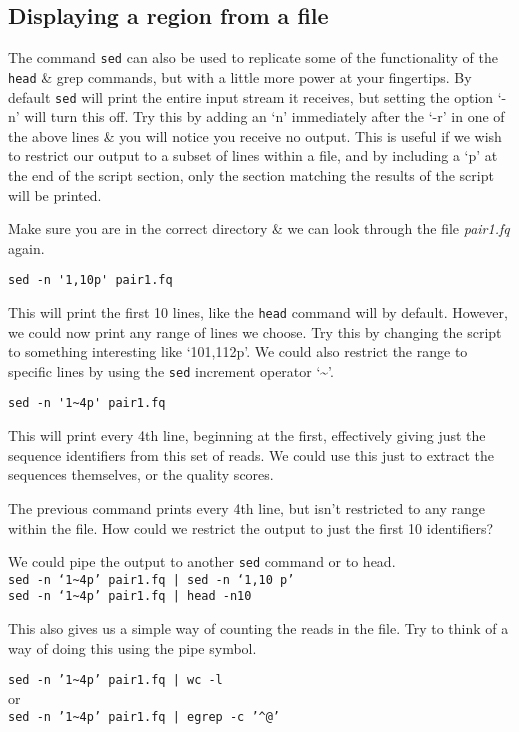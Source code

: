 \subsection*{Displaying a region from a file}
The command \texttt{sed} can also be used to replicate some of the functionality of the \texttt{head} \& grep commands, but with a little more power at your fingertips.
By default \texttt{sed} will print the entire input stream it receives, but setting the option `-n' will turn this off.
Try this by adding an `n' immediately after the `-r' in one of the above lines \& you will notice you receive no output.
This is useful if we wish to restrict our output to a subset of lines within a file, and by including a `p' at the end of the script section, only the section matching the results of the script will be printed.
\begin{steps}
Make sure you are in the correct directory \& we can look through the file \textit{pair1.fq} again.
\begin{lstlisting}
sed -n '1,10p' pair1.fq
\end{lstlisting}
This will print the first 10 lines, like the \texttt{head} command will by default.
However, we could now print any range of lines we choose.
Try this by changing the script to something interesting like `101,112p'.
We could also restrict the range to specific lines by using the \texttt{sed} increment operator `\~{}'.
\begin{lstlisting}
sed -n '1~4p' pair1.fq
\end{lstlisting}
This will print every 4th line, beginning at the first, effectively giving just the sequence identifiers from this set of reads.
We could use this just to extract the sequences themselves, or the quality scores.
\end{steps}

\begin{questions}
The previous command prints every 4th line, but isn't restricted to any range within the file.
How could we restrict the output to just the first 10 identifiers? \\
\begin{answer}
We could pipe the output to another \texttt{sed} command or  to head.\\
\texttt{sed -n `1\~{}4p' pair1.fq | sed -n `1,10 p'} \\
\texttt{sed -n `1\~{}4p' pair1.fq | head -n10} \\
\end{answer}

This also gives us a simple way of counting the reads in the file.
Try to think of a way of doing this using the pipe symbol.\\
\begin{answer}
\texttt{sed -n '1\~{}4p' pair1.fq | wc -l} \\
or \\
\texttt{sed -n '1\~{}4p' pair1.fq | egrep -c '\^{}@'}
\end{answer}
\end{questions}

